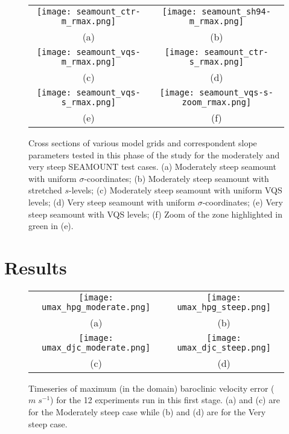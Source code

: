 \documentclass[authoryear]{elsarticle}
\begin{document}
\begin{figure}[htp]
	\centering
	\hspace{-7cm}
	\begin{tabular}{cc}
		\texttt{[image: seamount\_ctr-m\_rmax.png]} & \texttt{[image: seamount\_sh94-m\_rmax.png]} \\
		(a) & (b) \\
		\texttt{[image: seamount\_vqs-m\_rmax.png]} & \texttt{[image: seamount\_ctr-s\_rmax.png]} \\
		(c) & (d) \\
		\texttt{[image: seamount\_vqs-s\_rmax.png]} & \texttt{[image: seamount\_vqs-s-zoom\_rmax.png]} \\
		(e) & (f) \\
	\end{tabular}
	\hspace{-7cm}
	\caption{Cross sections of various model grids and correspondent slope parameters tested in this phase of the study for the moderately and very steep SEAMOUNT test cases. (a) Moderately steep seamount with uniform $\sigma$-coordinates; (b) Moderately steep seamount with stretched $s$-levels; (c) Moderately steep seamount with uniform VQS levels; (d) Very steep seamount with uniform $\sigma$-coordinates; (e) Very steep seamount with VQS levels; (f) Zoom of the zone highlighted in green in (e).}\label{fig:2}
\end{figure}

\newpage

\section{Results} \label{Sec_res} 

\begin{figure}[htp]
	\centering
	\hspace{-7cm}
	\begin{tabular}{cc}
		\texttt{[image: umax\_hpg\_moderate.png]} & \texttt{[image: umax\_hpg\_steep.png]} \\
		(a) & (b) \\
		\texttt{[image: umax\_djc\_moderate.png]} & \texttt{[image: umax\_djc\_steep.png]} \\
		(c) & (d) \\
	\end{tabular}
	\hspace{-7cm}
	\caption{Timeseries of maximum (in the domain) baroclinic velocity error ($m \; s^{-1}$) for the 12 experiments run in this first stage. (a) and (c) are for the Moderately steep case while (b) and (d) are for the Very steep case.}\label{fig:2}
\end{figure}
\end{document}
